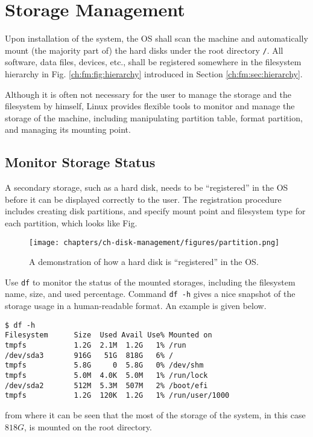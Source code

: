 \chapter{Storage Management}

Upon installation of the system, the OS shall scan the machine and automatically mount (the majority part of) the hard disks under the root directory \verb|/|. All software, data files, devices, etc., shall be registered somewhere in the filesystem hierarchy in Fig. \ref{ch:fm:fig:hierarchy} introduced in Section \ref{ch:fm:sec:hierarchy}.

Although it is often not necessary for the user to manage the storage and the filesystem by himself, Linux provides flexible tools to monitor and manage the storage of the machine, including manipulating partition table, format partition, and managing its mounting point.

\section{Monitor Storage Status}

A secondary storage, such as a hard disk, needs to be ``registered'' in the OS before it can be displayed correctly to the user. The registration procedure includes creating disk partitions, and specify mount point and filesystem type for each partition, which looks like Fig.

\begin{figure}
	\centering
	\texttt{[image: chapters/ch-disk-management/figures/partition.png]}
	\caption{A demonstration of how a hard disk is ``registered'' in the OS.} \label{ch:dm:fig:partition}
\end{figure}

Use \verb|df| to monitor the status of the mounted storages, including the filesystem name, size, and used percentage. Command \verb|df -h| gives a nice snapshot of the storage usage in a human-readable format. An example is given below.
\begin{lstlisting}
$ df -h
Filesystem      Size  Used Avail Use% Mounted on
tmpfs           1.2G  2.1M  1.2G   1% /run
/dev/sda3       916G   51G  818G   6% /
tmpfs           5.8G     0  5.8G   0% /dev/shm
tmpfs           5.0M  4.0K  5.0M   1% /run/lock
/dev/sda2       512M  5.3M  507M   2% /boot/efi
tmpfs           1.2G  120K  1.2G   1% /run/user/1000
\end{lstlisting}
from where it can be seen that the most of the storage of the system, in this case $818G$, is mounted on the root directory.

